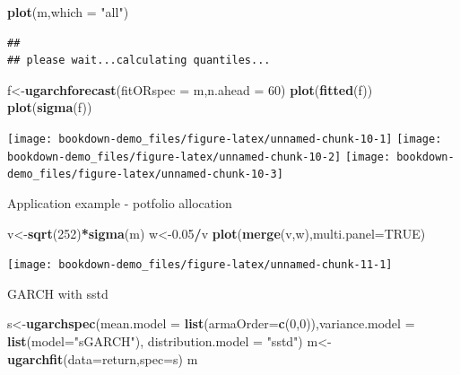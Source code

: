 \documentclass[
  12pt,
  a4paper,
  openany]{book}
\newenvironment{Shaded}{\begin{snugshade}}{\end{snugshade}}
\newcommand{\DataTypeTok}[1]{\textcolor[rgb]{0.13,0.29,0.53}{#1}}
\newcommand{\DecValTok}[1]{\textcolor[rgb]{0.00,0.00,0.81}{#1}}
\newcommand{\FloatTok}[1]{\textcolor[rgb]{0.00,0.00,0.81}{#1}}
\newcommand{\KeywordTok}[1]{\textcolor[rgb]{0.13,0.29,0.53}{\textbf{#1}}}
\newcommand{\NormalTok}[1]{#1}
\newcommand{\OperatorTok}[1]{\textcolor[rgb]{0.81,0.36,0.00}{\textbf{#1}}}
\newcommand{\OtherTok}[1]{\textcolor[rgb]{0.56,0.35,0.01}{#1}}
\newcommand{\StringTok}[1]{\textcolor[rgb]{0.31,0.60,0.02}{#1}}
\begin{document}
\begin{Shaded}
\begin{Highlighting}[]
\KeywordTok{plot}\NormalTok{(m,}\DataTypeTok{which =} \StringTok{"all"}\NormalTok{)}
\end{Highlighting}
\end{Shaded}

\begin{verbatim}
## 
## please wait...calculating quantiles...
\end{verbatim}

\begin{Shaded}
\begin{Highlighting}[]
\NormalTok{f\textless{}{-}}\KeywordTok{ugarchforecast}\NormalTok{(}\DataTypeTok{fitORspec =}\NormalTok{ m,}\DataTypeTok{n.ahead =} \DecValTok{60}\NormalTok{)}
\KeywordTok{plot}\NormalTok{(}\KeywordTok{fitted}\NormalTok{(f))}
\KeywordTok{plot}\NormalTok{(}\KeywordTok{sigma}\NormalTok{(f))}
\end{Highlighting}
\end{Shaded}

\begin{center}\texttt{[image: bookdown-demo\_files/figure-latex/unnamed-chunk-10-1]} \texttt{[image: bookdown-demo\_files/figure-latex/unnamed-chunk-10-2]} \texttt{[image: bookdown-demo\_files/figure-latex/unnamed-chunk-10-3]} \end{center}

Application example - potfolio allocation

\begin{Shaded}
\begin{Highlighting}[]
\NormalTok{v\textless{}{-}}\KeywordTok{sqrt}\NormalTok{(}\DecValTok{252}\NormalTok{)}\OperatorTok{*}\KeywordTok{sigma}\NormalTok{(m)}
\NormalTok{w\textless{}{-}}\FloatTok{0.05}\OperatorTok{/}\NormalTok{v}
\KeywordTok{plot}\NormalTok{(}\KeywordTok{merge}\NormalTok{(v,w),}\DataTypeTok{multi.panel=}\OtherTok{TRUE}\NormalTok{)}
\end{Highlighting}
\end{Shaded}

\begin{center}\texttt{[image: bookdown-demo\_files/figure-latex/unnamed-chunk-11-1]} \end{center}

GARCH with sstd

\begin{Shaded}
\begin{Highlighting}[]
\NormalTok{s\textless{}{-}}\KeywordTok{ugarchspec}\NormalTok{(}\DataTypeTok{mean.model =} \KeywordTok{list}\NormalTok{(}\DataTypeTok{armaOrder=}\KeywordTok{c}\NormalTok{(}\DecValTok{0}\NormalTok{,}\DecValTok{0}\NormalTok{)),}\DataTypeTok{variance.model =} \KeywordTok{list}\NormalTok{(}\DataTypeTok{model=}\StringTok{"sGARCH"}\NormalTok{),}
              \DataTypeTok{distribution.model =} \StringTok{"sstd"}\NormalTok{)}
\NormalTok{m\textless{}{-}}\KeywordTok{ugarchfit}\NormalTok{(}\DataTypeTok{data=}\NormalTok{return,}\DataTypeTok{spec=}\NormalTok{s)}
\NormalTok{m}
\end{Highlighting}
\end{Shaded}
\end{document}
